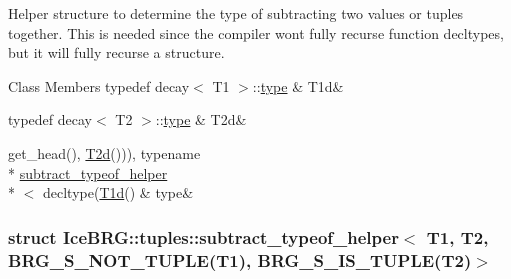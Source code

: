 Helper structure to determine the type of subtracting two values or tuples together. This is needed since the compiler won\textquotesingle{}t fully recurse function decltypes, but it will fully recurse a structure. \begin{DoxyFields}{Class Members}
\hypertarget{namespaceIceBRG_1_1tuples_a24369ce989b2bc35403b5197404686cb}{}typedef decay$<$ T1 $>$\+::\hyperlink{namespaceIceBRG_1_1tuples_aff9a31e443e09ed188186e3de584ea5d}{type}\label{namespaceIceBRG_1_1tuples_a24369ce989b2bc35403b5197404686cb}
&
T1d&
\\
\hline

\hypertarget{namespaceIceBRG_1_1tuples_a982e856de804f5226aedec5e50568fde}{}typedef decay$<$ T2 $>$\+::\hyperlink{namespaceIceBRG_1_1tuples_aff9a31e443e09ed188186e3de584ea5d}{type}\label{namespaceIceBRG_1_1tuples_a982e856de804f5226aedec5e50568fde}
&
T2d&
\\
\hline

\hypertarget{namespaceIceBRG_1_1tuples_aff9a31e443e09ed188186e3de584ea5d}{}get\+\_\+head(), \hyperlink{namespaceIceBRG_1_1tuples_a982e856de804f5226aedec5e50568fde}{T2d}())), typename \\*
\hyperlink{namespaceIceBRG_1_1tuples_structIceBRG_1_1tuples_1_1subtract__typeof__helper}{subtract\+\_\+typeof\+\_\+helper}\\*
$<$ decltype(\hyperlink{namespaceIceBRG_1_1tuples_a24369ce989b2bc35403b5197404686cb}{T1d}()\label{namespaceIceBRG_1_1tuples_aff9a31e443e09ed188186e3de584ea5d}
&
type&
\\
\hline

\end{DoxyFields}
\label{structIceBRG_1_1tuples_1_1subtract__typeof__helper_3_01T1_00_01T2_00_01BRG__S__NOT__TUPLE_07T1_055529bde261c2acf7cf4746a6301cbf1}
\hypertarget{namespaceIceBRG_1_1tuples_structIceBRG_1_1tuples_1_1subtract__typeof__helper_3_01T1_00_01T2_00_01BRG__S__NOT__TUPLE_07T1_055529bde261c2acf7cf4746a6301cbf1}{}
\subsubsection{struct Ice\+B\+R\+G\+:\+:tuples\+:\+:subtract\+\_\+typeof\+\_\+helper$<$ T1, T2, B\+R\+G\+\_\+\+S\+\_\+\+N\+O\+T\+\_\+\+T\+U\+P\+L\+E(T1), B\+R\+G\+\_\+\+S\+\_\+\+I\+S\+\_\+\+T\+U\+P\+L\+E(T2)$>$}
